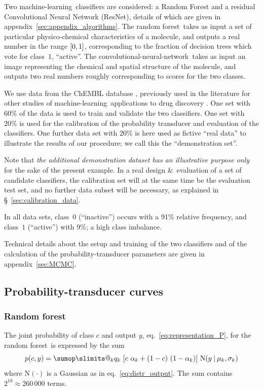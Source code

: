 \documentclass[\ifafour a4paper,12pt,\else a5paper,10pt,\fi%
onecolumn,oneside,article,%
british%
]{memoir}
\makeatletter
\theoremstyle{remark}
\theoremstyle{innote}
\def\sum{\DOTSI\sumop\slimits@}
\newcommand*{\amp}{\&}
\DeclarePairedDelimiter\clcl{[}{]}
\renewcommand*{\|}[1][]{\nonscript\:#1\vert\nonscript\:\mathopen{}}
\newcommand*{\sect}{\S}%
\newcommand*{\eqn}{eq.}%
\newcommand*{\cf}{{cf.}}
\newcommand*{\ml}{machine-learning}
\newcommand*{\RF}{random forest}
\newcommand*{\cnn}{convolutional-neural-network}
\newcommand*{\No}{\mathrm{N}}
\makeatother
\begin{document}
Two \ml\ classifiers are considered: a Random Forest and a residual Convolutional Neural Network (ResNet), details of which are given in appendix~\ref{sec:appendix_algorithms}. The \RF\ takes as input a set of particular physico-chemical characteristics of a molecule, and outputs a real number in the range $\clcl{0,1}$, corresponding to the fraction of decision trees which vote for class~$1$, \enquote{active}. The \cnn\ takes as input an image representing the chemical and spatial structure of the molecule, and outputs two real numbers roughly corresponding to scores for the two classes.

We use data from the ChEMBL database \autocites{bentoetal2014}, previously used in the literature for other studies of \ml\ applications to drug discovery \autocites{koutsoukasetal2017}. One set with 60\% of the data is used to train and validate the two classifiers. One set with 20\% is used for the calibration of the probability transducer and evaluation of the classifiers. One further data set with 20\% is here used as fictive \enquote{real data} to illustrate the results of our procedure; we call this the \enquote{demonstration set}.

Note that \emph{the additional demonstration dataset has an illustrative purpose only} for the sake of the present example. In a real design \amp\ evaluation of a set of candidate classifiers, the calibration set will at the same time be the evaluation test set, and no further data subset will be necessary, as explained in \sect~\ref{sec:calibration_data}.

In all data sets, class~$0$ (\enquote{inactive}) occurs with a 91\% relative frequency, and class~$1$ (\enquote{active}) with 9\%; a high class imbalance.

Technical details about the setup and training of the two classifiers and of the calculation of the probability-transducer parameters are given in appendix~\ref{sec:MCMC}.



\subsection{Probability-transducer curves}
\label{sec:demo_curves}

\subsubsection{Random forest}
\label{sec:curve_RF}

The joint probability of class $c$ and output $y$, \eqn~\eqref{eq:representation_P}, for the \RF\ is expressed by the sum
\begin{equation}
  \label{eq:P_c_out_RF}
  p(c, y) = \sum_{k} q_{k}\
  [c\ \alpha_{k} + (1-c)\ (1-\alpha_{k})]\ 
  \No(y \| \mu_{k}, \sigma_{k})
\end{equation}
where $\No(\cdot)$ is a Gaussian as in \eqn~\eqref{eq:distr_output}. The sum contains $2^{18} \approx 260\,000$ terms.
\end{document}
